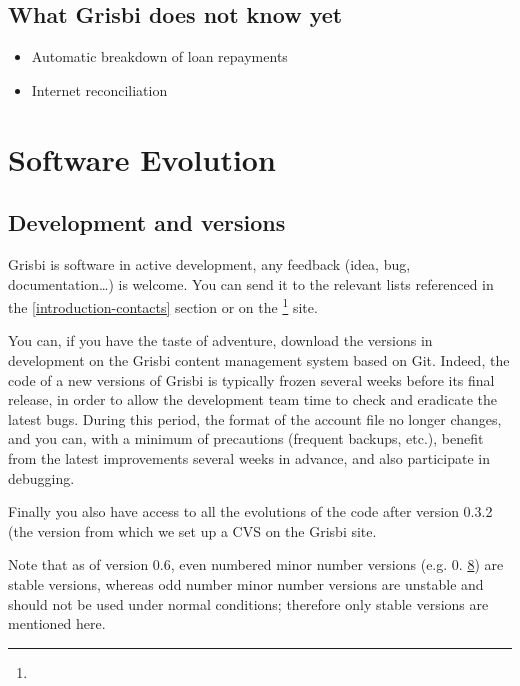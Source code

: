 \subsection{What Grisbi does not know yet}

\begin{itemize}

\item Automatic breakdown of loan repayments

\item Internet reconciliation

\end{itemize}

\section{Software Evolution}

\subsection{Development and versions}

Grisbi is software in active development, any feedback (idea, bug, documentation\dots) is welcome. You can send it to the relevant lists referenced in the  \vref{introduction-contacts}  section or on the  \footnote{\urlGrisbi{}} site.


You can, if you have the taste of adventure, download the versions in 
development on the Grisbi content management system based on \gls{Git}.
Indeed, the code of a new versions of Grisbi is typically frozen several weeks before its final release, in order to allow the development team time to check and eradicate the latest bugs. During this period, the format of the account file no longer changes, and you can, with a minimum of precautions (frequent backups, etc.), benefit from the latest improvements several weeks in advance, and also participate in debugging.

Finally you also have access to all the evolutions of the code after version 0.3.2 (the version from which we set up a \gls{CVS} on the Grisbi site.

Note that as of version 0.6, even numbered minor number versions (e.g. 0. \underline8) are stable versions, whereas odd number minor number versions are unstable and should not be used under normal conditions; therefore only stable versions are mentioned here.



